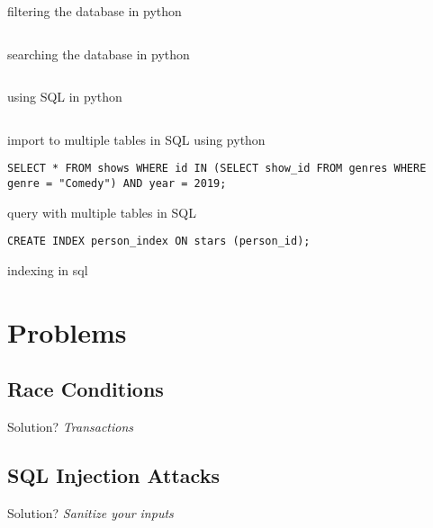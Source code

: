 \begin{code}
	\inputminted{python}{codes/src7/import2.py}
	\caption{filtering the database in python}
\end{code}

\begin{code}
	\inputminted{python}{codes/src7/search.py}
	\caption{searching the database in python}
\end{code}

\clearpage
\begin{code}
	\inputminted{python}{codes/src7/import3.py}
	\caption{using SQL in python}
\end{code}

\begin{code}
	\inputminted{python}{codes/src7/import4.py}
	\caption{import to multiple tables in SQL using python}
\end{code}

\begin{code}
	\begin{verbatim}
SELECT * FROM shows WHERE id IN (SELECT show_id FROM genres WHERE genre = "Comedy") AND year = 2019;
	\end{verbatim}
	\caption{query with multiple tables in SQL}
\end{code}

\begin{code}
	\begin{verbatim}
CREATE INDEX person_index ON stars (person_id);
	\end{verbatim}
	\caption{indexing in sql}
\end{code}

\section{Problems}
\subsection{Race Conditions}
Solution? \emph{Transactions}

\subsection{SQL Injection Attacks}
Solution? \emph{Sanitize your inputs}















